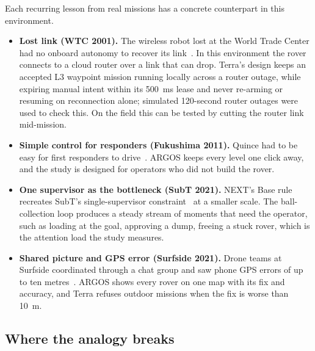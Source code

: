 Each recurring lesson from real missions has a concrete counterpart in this environment.

\begin{itemize}
\item \textbf{Lost link (WTC 2001).}
  The wireless robot lost at the World Trade Center had no onboard autonomy to recover its link~\citep{murphy2004rescue}.
  In this environment the rover connects to a cloud router over a link that can drop.
  Terra's design keeps an accepted L3 waypoint mission running locally across a router outage, while expiring manual intent within its 500~ms lease and never re-arming or resuming on reconnection alone; simulated 120-second router outages were used to check this.
  On the field this can be tested by cutting the router link mid-mission.
\item \textbf{Simple control for responders (Fukushima 2011).}
  Quince had to be easy for first responders to drive~\citep{nagatani2011fukushima}.
  ARGOS keeps every level one click away, and the study is designed for operators who did not build the rover.
\item \textbf{One supervisor as the bottleneck (SubT 2021).}
  NEXT's Base rule recreates SubT's single-supervisor constraint~\citep{ackerman2021subtoperators} at a smaller scale.
  The ball-collection loop produces a steady stream of moments that need the operator, such as loading at the goal, approving a dump, freeing a stuck rover, which is the attention load the study measures.
\item \textbf{Shared picture and GPS error (Surfside 2021).}
  Drone teams at Surfside coordinated through a chat group and saw phone GPS errors of up to ten metres~\citep{murphy2021surfside}.
  ARGOS shows every rover on one map with its fix and accuracy, and Terra refuses outdoor missions when the fix is worse than 10~m.
\end{itemize}

\subsection{Where the analogy breaks}

